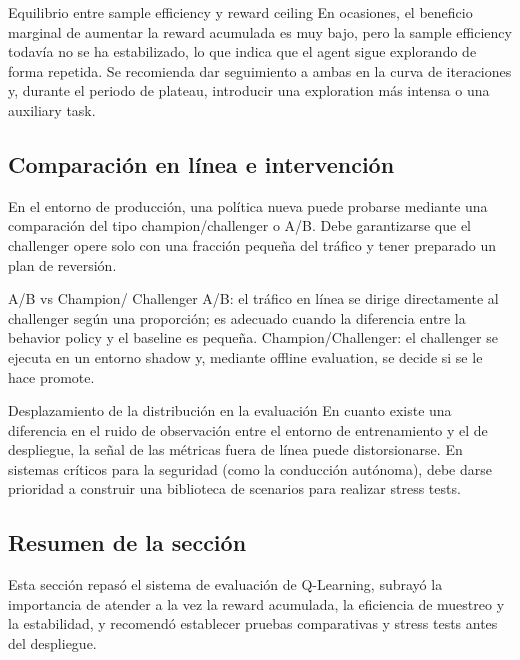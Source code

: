\documentclass[a4paper]{article}
\begin{document}
\begin{importantbox}{Equilibrio entre sample efficiency y reward ceiling}
En ocasiones, el beneficio marginal de aumentar la reward acumulada es muy bajo, pero la sample efficiency todavía no se ha estabilizado, lo que indica que el agent sigue explorando de forma repetida. Se recomienda dar seguimiento a ambas en la curva de iteraciones y, durante el periodo de plateau, introducir una exploration más intensa o una auxiliary task.
\end{importantbox}

\subsection{Comparación en línea e intervención}

En el entorno de producción, una política nueva puede probarse mediante una comparación del tipo champion/challenger o A/B. Debe garantizarse que el challenger opere solo con una fracción pequeña del tráfico y tener preparado un plan de reversión.

\begin{knowledgebox}{A/B vs Champion/ Challenger}
A/B: el tráfico en línea se dirige directamente al challenger según una proporción; es adecuado cuando la diferencia entre la behavior policy y el baseline es pequeña. Champion/Challenger: el challenger se ejecuta en un entorno shadow y, mediante offline evaluation, se decide si se le hace promote.
\end{knowledgebox}

\begin{warningbox}{Desplazamiento de la distribución en la evaluación}
En cuanto existe una diferencia en el ruido de observación entre el entorno de entrenamiento y el de despliegue, la señal de las métricas fuera de línea puede distorsionarse. En sistemas críticos para la seguridad (como la conducción autónoma), debe darse prioridad a construir una biblioteca de scenarios para realizar stress tests.
\end{warningbox}

\subsection{Resumen de la sección}

Esta sección repasó el sistema de evaluación de Q-Learning, subrayó la importancia de atender a la vez la reward acumulada, la eficiencia de muestreo y la estabilidad, y recomendó establecer pruebas comparativas y stress tests antes del despliegue.
\end{document}
